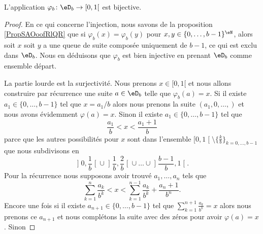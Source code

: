 \begin{theorem} \label{ThoRXBootpUpd}
    L'application \( \varphi_b\colon \eD_b\to \mathopen[ 0 , 1 [\) est bijective.
\end{theorem}

\begin{proof}
    En ce qui concerne l'injection, nous savons de la proposition \ref{PropSAOoofRlQR} que si \( \varphi_b(x)=\varphi_b(y)\) pour \( x,y\in\{ 0,\ldots, b-1 \}^{\eN}\), alors soit \( x\) soit \( y\) a une queue de suite composée uniquement de \( b-1\), ce qui est exclu dans \( \eD_b\). Nous en déduisons que \( \varphi_b\) est bien injective en prenant \( \eD_b\) comme ensemble départ.

    La partie lourde est la surjectivité. Nous prenons \( x\in \mathopen[ 0 , 1 [\) et nous allons construire par récurrence une suite \( a\in \eD_b\) telle que \( \varphi_b(a)=x\). Si il existe \( a_1\in\{ 0,\ldots, b-1 \}\) tel que \( x=a_1/b\) alors nous prenons la suite \( (a_1,0,\ldots, )\) et nous avons évidemment \( \varphi(a)=x\). Sinon il existe \( a_1\in\{ 0,\ldots, b-1 \}\) tel que
        \begin{equation}
            \frac{ a_1 }{ b }<x<\frac{ a_1+1 }{ b }
        \end{equation}
        parce que les autres possibilités pour \( x\) sont dans l'ensemble \( \mathopen[ 0 , 1 \mathclose[\setminus\{ \frac{ k }{ b } \}_{k=0,\ldots, b-1}\) que nous subdivisons en
        \begin{equation}
        \mathopen] 0 , \frac{1}{ b } \mathclose[\cup\mathopen] \frac{1}{ b } , \frac{ 2 }{ b } \mathclose[\cup\ldots\cup\mathopen] \frac{ b-1 }{ b } , 1 \mathclose[.
        \end{equation}
        Pour la récurrence nous supposons avoir trouvé \( a_1,\ldots, a_n\) tels que
        \begin{equation}
            \sum_{k=1}^n\frac{ a_k }{ b^k }< x<\sum_{k=1}^{n-1}\frac{ a_k }{ b^k }+\frac{ a_n+1 }{ b^n }.
        \end{equation}
    Encore une fois si il existe \( a_{n+1}\in\{ 0,\ldots, b-1 \}\) tel que \( \sum_{k=1}^{n+1}\frac{ a_k }{ b^k }=x\) alors nous prenons ce \( a_{n+1}\) et nous complétons la suite avec des zéros pour avoir \( \varphi(a)=x\). Sinon 

\end{proof}
